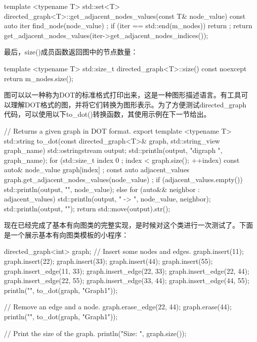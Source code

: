 \begin{cpp}
template <typename T>
std::set<T> directed_graph<T>::get_adjacent_nodes_values(const T& node_value) const
{
    auto iter { find_node(node_value) };
    if (iter == std::end(m_nodes)) { return {}; }
    return get_adjacent_nodes_values(iter->get_adjacent_nodes_indices());
}
\end{cpp}


最后，size()成员函数返回图中的节点数量：

\begin{cpp}
template <typename T>
std::size_t directed_graph<T>::size() const noexcept
{
    return m_nodes.size();
}
\end{cpp}


图可以以一种称为DOT的标准格式打印出来，这是一种图形描述语言。有工具可以理解DOT格式的图，并将它们转换为图形表示。为了方便测试directed\_graph代码，可以使用以下to\_dot()转换函数，其使用示例在下一节给出。

\begin{cpp}
// Returns a given graph in DOT format.
export template <typename T>
std::string to_dot(const directed_graph<T>& graph, std::string_view graph_name)
{
    std::ostringstream output;
    std::println(output, "digraph {} {{", graph_name);
            for (std::size_t index { 0 }; index < graph.size(); ++index) {
                const auto& node_value { graph[index] };
                const auto adjacent_values { graph.get_adjacent_nodes_values(node_value) };
                if (adjacent_values.empty()) {
                    std::println(output, "{}", node_value);
                } else {
                    for (auto&& neighbor : adjacent_values) {
                        std::println(output, "{} -> {}", node_value, neighbor);
                    }
                }
            }
            std::println(output, "}}");
    return std::move(output).str();
}
\end{cpp}


现在已经完成了基本有向图类的完整实现，是时候对这个类进行一次测试了。下面是一个展示基本有向图类模板的小程序：

\begin{cpp}
directed_graph<int> graph;
// Insert some nodes and edges.
graph.insert(11);
graph.insert(22);
graph.insert(33);
graph.insert(44);
graph.insert(55);
graph.insert_edge(11, 33);
graph.insert_edge(22, 33);
graph.insert_edge(22, 44);
graph.insert_edge(22, 55);
graph.insert_edge(33, 44);
graph.insert_edge(44, 55);
println("{}", to_dot(graph, "Graph1"));

// Remove an edge and a node.
graph.erase_edge(22, 44);
graph.erase(44);
println("{}", to_dot(graph, "Graph1"));

// Print the size of the graph.
println("Size: {}", graph.size());
\end{cpp}

